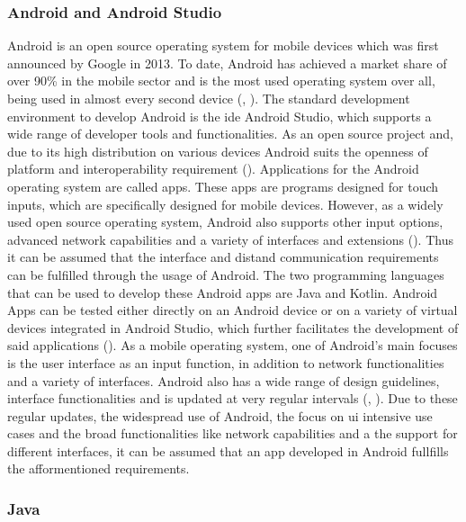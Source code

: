 \subsubsection{Android and Android Studio}

Android is an open source operating system for mobile devices which was first announced by Google in 2013. To date, Android has achieved a market share of over 90\% in the mobile sector and is the most used operating system over all, being used in almost every second device (\cite{statcounter.2023}, \cite{Richter.2019}). The standard development environment to develop Android is the \ac{ide} Android Studio, which supports a wide range of developer tools and functionalities. As an open source project and, due to its high distribution on various devices Android suits the openness of platform and interoperability requirement (\cite{Richter.2019}). Applications for the Android operating system are called apps. These apps are programs designed for touch inputs, which are specifically designed for mobile devices. However, as a widely used open source operating system, Android also supports other input options, advanced network capabilities and a variety of interfaces and extensions (\cite{Richter.2019}). Thus it can be assumed that the interface and distand communication requirements can be fulfilled through the usage of Android. The two programming languages that can be used to develop these Android apps are Java and Kotlin. Android Apps can be tested either directly on an Android device or on a variety of virtual devices integrated in Android Studio, which further facilitates the development of said applications (\cite{Richter.2019}). As a mobile operating system, one of Android's main focuses is the user interface as an input function, in addition to network functionalities and a variety of interfaces. Android also has a wide range of design guidelines, interface functionalities and is updated at very regular intervals (\cite{statista.2023}, \cite{Richter.2019}). Due to these regular updates, the widespread use of Android, the focus on \ac{ui} intensive use cases and the broad functionalities like network capabilities and a the support for different interfaces, it can be assumed that an app developed in Android fullfills the afformentioned requirements.

\subsubsection{Java}

